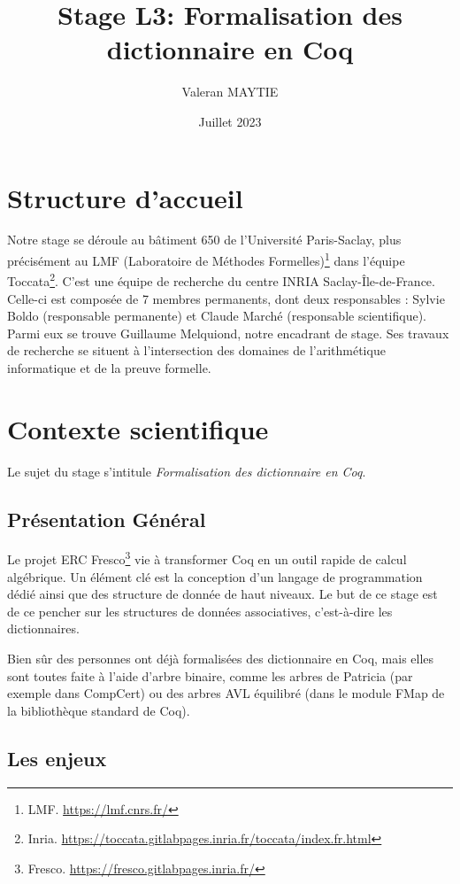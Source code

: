 \documentclass{article}
\title{Stage L3: Formalisation des dictionnaire en Coq}
\author{Valeran MAYTIE}
\date{Juillet 2023}
\begin{document}
  \maketitle

  \section{Structure d'accueil}

  Notre stage se déroule au bâtiment 650 de l'Université Paris-Saclay, plus
précisément au LMF (Laboratoire de Méthodes Formelles)\footnote{LMF.
\url{https://lmf.cnrs.fr/}} dans l'équipe Toccata\footnote{Inria.
\url{https://toccata.gitlabpages.inria.fr/toccata/index.fr.html}}. C'est une
équipe de recherche du centre INRIA Saclay-Île-de-France. Celle-ci est composée
de 7 membres permanents, dont deux responsables : Sylvie Boldo (responsable
permanente) et Claude Marché (responsable scientifique). Parmi eux se trouve
Guillaume Melquiond, notre encadrant de stage. Ses travaux de recherche se
situent à l'intersection des domaines de l'arithmétique informatique et de
la preuve formelle.

  \section{Contexte scientifique}

  Le sujet du stage s'intitule \textit{Formalisation des dictionnaire en Coq}.

    \subsection{Présentation Général}

  Le projet ERC Fresco\footnote{Fresco. \url{https://fresco.gitlabpages.inria.fr/}}
vie à transformer Coq en un outil rapide de calcul algébrique. Un élément clé
est la conception d'un langage de programmation dédié ainsi que des structure de
donnée de haut niveaux. Le but de ce stage est de ce pencher sur les structures
de données associatives, c'est-à-dire les dictionnaires.

  Bien sûr des personnes ont déjà formalisées des dictionnaire en Coq, mais
elles sont toutes faite à l'aide d'arbre binaire, comme les arbres de Patricia
(par exemple dans CompCert) ou des arbres AVL équilibré (dans le module FMap de
la bibliothèque standard de Coq).

    \subsection{Les enjeux}
\end{document}
